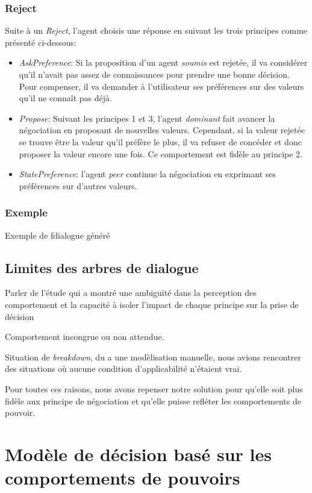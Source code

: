 		\subsubsection{Reject}
			Suite à un \emph{Reject}, l'agent choisis une réponse en suivant les trois principes comme présenté ci-dessous:
			\begin{itemize}
				\item \emph{AskPreference}: Si la proposition d'un agent \emph{soumis} est rejetée, il va considérer qu'il n'avait pas assez de connaissances pour prendre une bonne décision. Pour compenser, il va demander à l'utilisateur ses préférences sur des valeurs qu'il ne connaît pas déjà. 
				
				\item \emph{Propose}: Suivant les principes 1 et 3, l'agent \emph{dominant} fait avancer la négociation en proposant de nouvelles valeurs. Cependant, si la valeur rejetée se trouve être la valeur qu'il préfère le plus, il va refuser de concéder et donc proposer la valeur encore une fois. Ce comportement est fidèle au principe 2. 
				
				\item \emph{StatePreference}: l'agent \emph{peer} continue la négociation en exprimant ses préférences sur d'autres valeurs. 
			\end{itemize}	
			
	\subsubsection{Exemple}	Exemple de fdialogue généré
	
	\subsection{Limites des arbres de dialogue}
		Parler de l'étude qui a montré une ambiguité dans la perception des comportement et la capacité à isoler l'impact de chaque principe sur la prise de décision
		
		Comportement incongrue ou non attendue.
		
		Situation de \textit{breakdown}, du a une modèlisation manuelle, nous avions rencontrer des situations où aucune condition d'applicabilité n'étaient vrai. 
		
		Pour toutes ces raisons, nous avons repenser notre solution pour qu'elle soit plus fidèle aux principe de négociation et qu'elle puisse refléter les comportements de pouvoir. 
	
	\section{Modèle de décision basé sur les comportements de pouvoirs}
	